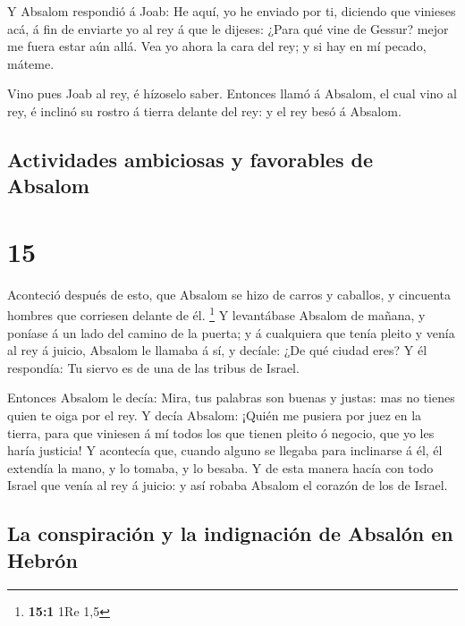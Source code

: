  Y Absalom respondió á Joab: He aquí, yo he enviado por ti,
diciendo que vinieses acá, á fin de enviarte yo al rey á que le dijeses:
¿Para qué vine de Gessur? mejor me fuera estar aún allá. Vea yo ahora la
cara del rey; y si hay en mí pecado, máteme.

 Vino pues Joab al rey, é hízoselo saber. Entonces llamó á
Absalom, el cual vino al rey, é inclinó su rostro á tierra delante del
rey: y el rey besó á Absalom.

\hypertarget{actividades-ambiciosas-y-favorables-de-absalom}{%
\subsection{Actividades ambiciosas y favorables de
Absalom}\label{actividades-ambiciosas-y-favorables-de-absalom}}

\hypertarget{section-14}{%
\section{15}\label{section-14}}

 Aconteció después de esto, que Absalom se hizo de carros y
caballos, y cincuenta hombres que corriesen delante de él. \footnote{\textbf{15:1}
  1Re 1,5}  Y levantábase Absalom de mañana, y poníase á un
lado del camino de la puerta; y á cualquiera que tenía pleito y venía al
rey á juicio, Absalom le llamaba á sí, y decíale: ¿De qué ciudad eres? Y
él respondía: Tu siervo es de una de las tribus de Israel.

 Entonces Absalom le decía: Mira, tus palabras son buenas y
justas: mas no tienes quien te oiga por el rey.  Y decía
Absalom: ¡Quién me pusiera por juez en la tierra, para que viniesen á mí
todos los que tienen pleito ó negocio, que yo les haría justicia!
 Y acontecía que, cuando alguno se llegaba para inclinarse á
él, él extendía la mano, y lo tomaba, y lo besaba.  Y de
esta manera hacía con todo Israel que venía al rey á juicio: y así
robaba Absalom el corazón de los de Israel.

\hypertarget{la-conspiraciuxf3n-y-la-indignaciuxf3n-de-absaluxf3n-en-hebruxf3n}{%
\subsection{La conspiración y la indignación de Absalón en
Hebrón}\label{la-conspiraciuxf3n-y-la-indignaciuxf3n-de-absaluxf3n-en-hebruxf3n}}

